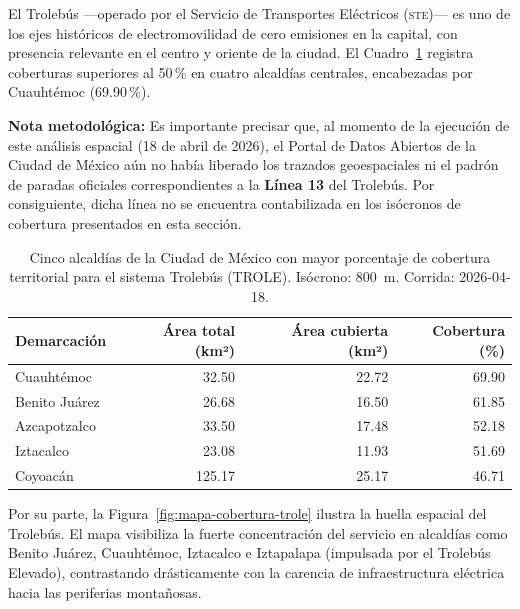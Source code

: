 El Trolebús —operado por el Servicio de Transportes Eléctricos (\textsc{ste})—
es uno de los ejes históricos de electromovilidad de cero emisiones en la capital,
con presencia relevante en el centro y oriente de la ciudad. El
Cuadro~\ref{tab:cobertura-trole-cdmx} registra coberturas superiores al 50\,\%
en cuatro alcaldías centrales, encabezadas por Cuauhtémoc (69.90\,\%).

\textbf{Nota metodológica:} Es importante precisar que, al momento de la
ejecución de este análisis espacial (18 de abril de 2026), el Portal de Datos
Abiertos de la Ciudad de México aún no había liberado los trazados geoespaciales
ni el padrón de paradas oficiales correspondientes a la \textbf{Línea 13} del
Trolebús. Por consiguiente, dicha línea no se encuentra contabilizada en los
isócronos de cobertura presentados en esta sección.

\begin{table}[H]
    \centering
    \caption[Alcaldías con mayor cobertura de Trolebús (CDMX)]{
    Cinco alcaldías de la Ciudad de México con mayor porcentaje de cobertura
    territorial para el sistema Trolebús (TROLE). Isócrono: 800~m.
    Corrida: 2026-04-18.}
    \label{tab:cobertura-trole-cdmx}
    \begin{tabular}{|l|r|r|r|}
        \hline
        \textbf{Demarcación} & \textbf{Área total (km²)} & \textbf{Área cubierta (km²)} & \textbf{Cobertura (\%)} \\
        \hline
        Cuauhtémoc    &  32.50 & 22.72 &  69.90 \\
        Benito Juárez &  26.68 & 16.50 &  61.85 \\
        Azcapotzalco  &  33.50 & 17.48 &  52.18 \\
        Iztacalco     &  23.08 & 11.93 &  51.69 \\
        Coyoacán      & 125.17 & 25.17 &  46.71 \\
        \hline
    \end{tabular}
\end{table}

Por su parte, la Figura~\ref{fig:mapa-cobertura-trole} ilustra la huella espacial
del Trolebús. El mapa visibiliza la fuerte concentración del servicio en alcaldías
como Benito Juárez, Cuauhtémoc, Iztacalco e Iztapalapa (impulsada por el Trolebús
Elevado), contrastando drásticamente con la carencia de infraestructura eléctrica
hacia las periferias montañosas.

